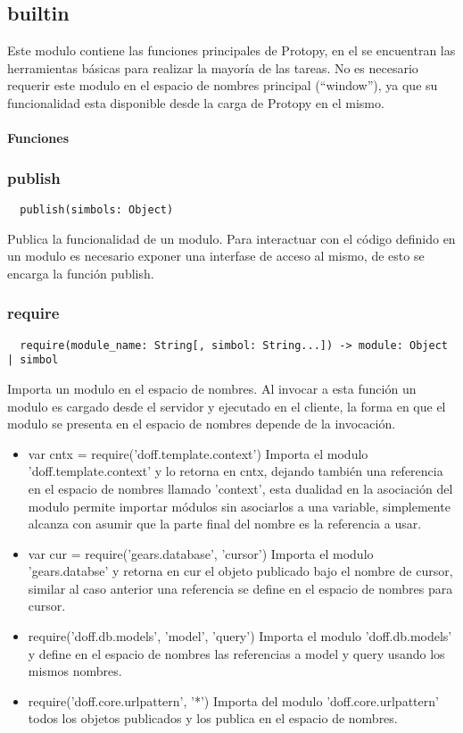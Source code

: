 \subsection{builtin}
Este modulo contiene las funciones principales de Protopy, en el se encuentran
las herramientas básicas para realizar la mayoría de las tareas.
No es necesario requerir este modulo en el espacio de nombres principal
(``window''), ya que su funcionalidad esta disponible desde la carga de Protopy
en el mismo.

\paragraph{Funciones}
\subsubsection*{publish}
\begin{verbatim}
  publish(simbols: Object)
\end{verbatim}
Publica la funcionalidad de un modulo.
Para interactuar con el código definido en un modulo es necesario exponer una
interfase de acceso al mismo, de esto se encarga la función publish.

\subsubsection*{require}
\begin{verbatim}
  require(module_name: String[, simbol: String...]) -> module: Object | simbol
\end{verbatim} 
Importa un modulo en el espacio de nombres.
Al invocar a esta función un modulo es cargado desde el servidor y ejecutado en
el cliente, la forma en que el modulo se presenta en el espacio de nombres
depende de la invocación.
\begin{itemize}
  \item {var cntx = require('doff.template.context')} Importa el modulo
  'doff.template.context' y lo retorna en cntx, dejando también una referencia
  en el espacio de nombres llamado 'context', esta dualidad en la asociación
  del modulo permite importar módulos sin asociarlos a una variable,
  simplemente alcanza con asumir que la parte final del nombre es la referencia
  a usar.
 \item{var cur = require('gears.database', 'cursor')} Importa el modulo
 'gears.databse' y retorna en cur el objeto publicado bajo el nombre de cursor,
 similar al caso anterior una referencia se define en el espacio de nombres
 para cursor.
 \item{require('doff.db.models', 'model', 'query')}
  Importa el modulo 'doff.db.models' y define en el espacio de nombres las
referencias a model y query usando los mismos nombres.
 \item{require('doff.core.urlpattern', '*')} Importa del modulo
 'doff.core.urlpattern' todos los objetos publicados y los publica en el
 espacio de nombres.
\end{itemize}

